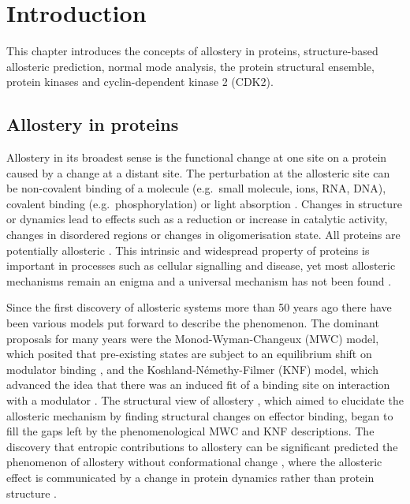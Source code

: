 \chapter{Introduction}
\label{cha:introduction}

This chapter introduces the concepts of allostery in proteins, structure-based allosteric prediction, normal mode analysis, the protein structural ensemble, protein kinases and cyclin-dependent kinase 2 (CDK2).


\section{Allostery in proteins}
\label{sec:introduction_allostery}

Allostery in its broadest sense is the functional change at one site on a protein caused by a change at a distant site.
The perturbation at the allosteric site can be non-covalent binding of a molecule (e.g.\ small molecule, ions, RNA, DNA), covalent binding (e.g.\ phosphorylation) or light absorption \cite{Nussinov2013}.
Changes in structure or dynamics lead to effects such as a reduction or increase in catalytic activity, changes in disordered regions or changes in oligomerisation state.
All proteins are potentially allosteric \cite{Gunasekaran2004}.
This intrinsic and widespread property of proteins is important in processes such as cellular signalling and disease, yet most allosteric mechanisms remain an enigma and a universal mechanism has not been found \cite{Motlagh2014}.

Since the first discovery of allosteric systems more than 50 years ago there have been various models put forward to describe the phenomenon.
The dominant proposals for many years were the Monod-Wyman-Changeux (MWC) model, which posited that pre-existing states are subject to an equilibrium shift on modulator binding \cite{Monod1965}, and the Koshland-N\'{e}methy-Filmer (KNF) model, which advanced the idea that there was an induced fit of a binding site on interaction with a modulator \cite{Koshland1966}.
The structural view of allostery \cite{Perutz1970}, which aimed to elucidate the allosteric mechanism by finding structural changes on effector binding, began to fill the gaps left by the phenomenological MWC and KNF descriptions.
The discovery that entropic contributions to allostery can be significant predicted the phenomenon of allostery without conformational change \cite{Cooper1984}, where the allosteric effect is communicated by a change in protein dynamics rather than protein structure \cite{Motlagh2014}.

